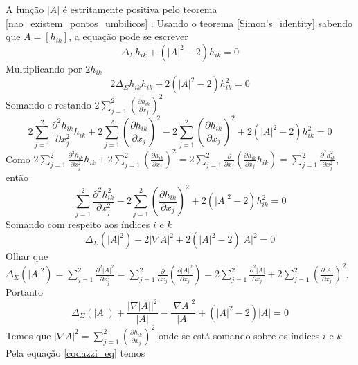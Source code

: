 \begin{demonstracao}
	A função $|A|$ é estritamente positiva pelo teorema \ref{nao_existem_pontos_umbilicos} . Usando o  teorema \ref{Simon's_identity} sabendo que $A = [h_{ik}]$, a equação pode se escrever
	\begin{equation*}
		\Delta_{\Sigma} h_{ik} + (|A|^2 - 2)h_{ik} = 0
	\end{equation*}	
	Multiplicando por $2 h_{ik}$
	\begin{equation*}
		2 \Delta_{\Sigma} h_{ik} h_{ik} + 2 (|A|^2 - 2)h_{ik}^2 = 0
	\end{equation*}	
	Somando e restando $ 2 \sum_{j=1}^2 \left( \frac{\partial h_{ik}}{\partial x_j} \right)^2 $
	\begin{equation*}
		2 \sum_{j=1}^2 \frac{\partial^2 h_{ik}}{\partial x_j^2} h_{ik} + 2 \sum_{j=1}^2 \left( \frac{\partial h_{ik}}{\partial x_j} \right)^2 - 2 \sum_{j=1}^2 \left( \frac{\partial h_{ik}}{\partial x_j} \right)^2 + 2 (|A|^2 - 2)h_{ik}^2 = 0
	\end{equation*}	
	Como $ 2 \sum_{j=1}^2 \frac{\partial^2 h_{ik}}{\partial x_j^2} h_{ik} + 2 \sum_{j=1}^2 \left( \frac{\partial h_{ik}}{\partial x_j} \right)^2 = 2 \sum_{j=1}^2 \frac{\partial }{\partial x_j} \left( \frac{\partial h_{ik}}{\partial x_j} h_{ik} \right) = \sum_{j=1}^2 \frac{\partial^2 h_{ik}^2}{\partial x_j^2} $, então
	\begin{equation*}
		\sum_{j=1}^2 \frac{\partial^2 h_{ik}^2}{\partial x_j^2} - 2 \sum_{j=1}^2 \left( \frac{\partial h_{ik}}{\partial x_j} \right)^2 + 2 (|A|^2 - 2)h_{ik}^2 = 0
	\end{equation*}	
	Somando com respeito aos índices $i$ e $k$
	\begin{equation*}
	\Delta_{\Sigma} (|A|^2) - 2 | \nabla A |^2 + 2 (|A|^2 - 2) |A|^2 = 0
	\end{equation*}	
	Olhar que $ \Delta_{\Sigma} (|A|^2) = \sum_{j=1}^2 \frac{\partial^2 |A|^2}{\partial x_j^2} = \sum_{j=1}^2 \frac{\partial}{\partial x_j} \left( \frac{\partial |A|^2}{\partial x_j} \right) = 2 \sum_{j=1}^2 \frac{\partial^2 |A|}{\partial x_j} + 2 \sum_{j=1}^2 \left( \frac{\partial |A|}{\partial x_j} \right)^2 $. Portanto
	\begin{equation}\label{edp_sff}
		\Delta_{\Sigma} (|A|) + \frac{|\nabla |A||^2}{|A|} - \frac{|\nabla A|^2}{|A|} + (|A|^2 - 2) |A| = 0
	\end{equation}	
	Temos que $ | \nabla A |^2 = \sum_{j=1}^2 \left( \frac{\partial h_{ik}}{\partial x_j} \right)^2 $ onde se está somando sobre os índices $i$ e $k$. Pela equação \eqref{codazzi_eq} temos

\end{demonstracao}

